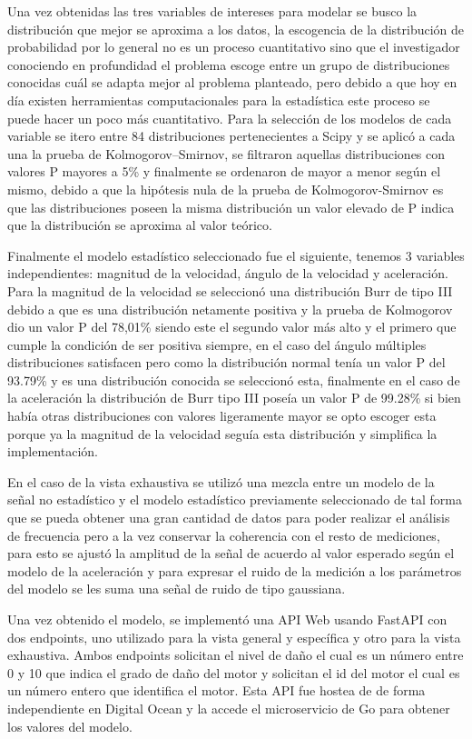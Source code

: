 Una vez obtenidas las tres variables de intereses para modelar se busco la
distribución que mejor se aproxima a los datos, la escogencia de la
distribución de probabilidad por lo general no es un proceso cuantitativo sino
que el investigador conociendo en profundidad el problema escoge entre un grupo
de distribuciones conocidas cuál se adapta mejor al problema planteado, pero
debido a que hoy en día existen herramientas computacionales para la
estadística este proceso se puede hacer un poco más cuantitativo. Para la
selección de los modelos de cada variable se itero entre 84 distribuciones
pertenecientes a Scipy y se aplicó a cada una la prueba de Kolmogorov–Smirnov,
se filtraron aquellas distribuciones con valores P mayores a 5\% y finalmente se
ordenaron de mayor a menor según el mismo, debido a que la hipótesis nula de la
prueba de Kolmogorov-Smirnov es que las distribuciones poseen la misma
distribución un valor elevado de P indica que la distribución se aproxima al
valor teórico.

Finalmente el modelo estadístico seleccionado fue el siguiente, tenemos 3
variables independientes: magnitud de la velocidad, ángulo de la velocidad y
aceleración. Para la magnitud de la velocidad se seleccionó una distribución
Burr de tipo III debido a que es una distribución netamente positiva y la
prueba de Kolmogorov dio un valor P del 78,01\% siendo este el segundo valor más
alto y el primero que cumple la condición de ser positiva siempre, en el caso
del ángulo múltiples distribuciones satisfacen pero como la distribución normal
tenía un valor P del 93.79\% y es una distribución conocida se seleccionó esta,
finalmente en el caso de la aceleración la distribución de Burr tipo III poseía
un valor P de 99.28\% si bien había otras distribuciones con valores ligeramente
mayor se opto escoger esta porque ya la magnitud de la velocidad seguía esta
distribución y simplifica la implementación.

En el caso de la vista exhaustiva se utilizó una mezcla entre un modelo de la
señal no estadístico y el modelo estadístico previamente seleccionado de tal
forma que se pueda obtener una gran cantidad de datos para poder realizar el
análisis de frecuencia pero a la vez conservar la coherencia con el resto de
mediciones, para esto se ajustó la amplitud de la señal de acuerdo al valor
esperado según el modelo de la aceleración y para expresar el ruido de la
medición a los parámetros del modelo se les suma una señal de ruido de tipo
gaussiana.

Una vez obtenido el modelo, se implementó una API Web usando FastAPI con dos
endpoints, uno utilizado para la vista general y específica y otro para la
vista exhaustiva. Ambos endpoints solicitan el nivel de daño el cual es un
número entre 0 y 10 que indica el grado de daño del motor y solicitan el id del
motor el cual es un número entero  que identifica el motor. Esta API fue hostea
de de forma independiente en Digital Ocean y la accede el microservicio de Go
para obtener los valores del modelo.
